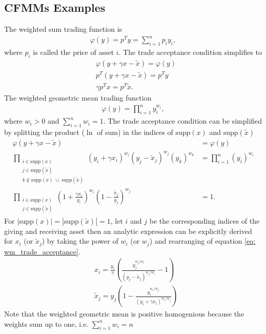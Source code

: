 \subsection{CFMMs Examples}
The weighted sum trading function is
\begin{align}
    \varphi(y) = p^{T}y = \sum_{i=1}^{n} p_i y_i, \label{eq: weighted_sum}
\end{align}
where $p_i$ is called the price of asset $i$. The trade acceptance condition
simplifies to
\begin{align}
    &\varphi(y+\gamma x- \tilde{x}) = \varphi(y) \nonumber \\
    &p^{T} (y +\gamma x - \tilde{x}) = p^{T} y \nonumber \\
    &\gamma p^{T} x = p^{T} \tilde{x}.
\end{align}
The weighted geometric mean trading function
\begin{align}
    \varphi(y) = \prod_{i=1}^{n} y_i^{w_i}, \label{eq: weighted_geo_mean}
\end{align}
where $w_i > 0 $ and $\sum_{i=1}^{n} w_i=1$. The trade acceptance condition can be
simplified by splitting the product ($\ln$ of sum) in the indices of
$\text{supp}(x)$ and $\text{supp}(\tilde{x})$
\begin{align}
    \varphi(y+\gamma x- \tilde{x}) &= \varphi(y) \nonumber \\
    \prod\limits_{\substack{i \in \text{supp}(x) \\
    j \in \text{supp}(\tilde{x}) \\
    k \notin \text{supp}(x)\; \cup\; \text{supp}(\tilde{x})  }}
    (y_i + \gamma x_i)^{w_i}
    (y_j - \tilde{x}_j)^{w_j}
    (y_k)^{w_k} &= \prod_{i=1}^{n} (y_i)^{w_i} \nonumber\\
    \prod\limits_{\substack{i \in \text{supp}(x) \\
    j \in \text{supp}(\tilde{x})}}
    \left(1 + \frac{\gamma x_i}{y_i}\right)^{w_i}
    \left(1 - \frac{\tilde{x}_j}{y_j}\right)^{w_j}
    &= 1.\label{eq: wm_trade_acceptance}
\end{align}
For $|\text{supp}(x)| = |\text{supp}(\tilde{x})| = 1$, let $i$ and $j$ be the
corresponding indices of the giving and receiving asset then an analytic
expression can be explicitly derived  for $x_i$ (or $\tilde{x}_j$) by
taking the power of $w_i$ (or $w_j$) and rearranging of equation
\ref{eq: wm_trade_acceptance}.
\begin{align}
&x_i = \frac{y_i}{\gamma}\left(
\frac{y_j^{w_j/w_i}}{\left(y_j - \tilde{x}_j \right)^{w_j/w_i}} - 1
\right) \label{eq: gm_fef}\\
&\tilde{x}_j= y_j\left(
    1 - \frac{y_i^{w_i/w_j}}{\left(y_i+\gamma x_i\right)^{w_i/w_j} }
\right) \label{eq: gm_ref}
\end{align}
Note that the weighted geometric mean is positive homogenious because the
weights sum up to one, i.e. $\sum_{i=1}^{n}w_i = n $



